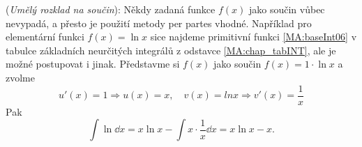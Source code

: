 \begin{mdframed}[style=mdexam]
  \begin{example}\label{mai:exam109}
    (\emph{Umělý rozklad na součin}): Někdy zadaná funkce \(f(x)\) jako součin vůbec nevypadá, a
    přesto je použití metody per partes vhodné. Například pro elementární funkci \(f(x) = \ln x\)
    sice najdeme primitivní funkci \ref{MA:baseInt06} v tabulce základních neurčitých integrálů z
    odstavce \ref{MA:chap_tabINT}, ale je možné postupovat i jinak. Představme si \(f(x)\) jako
    součin \(f(x) = 1\cdot\ln x\) a zvolme \[u'(x) = 1 ⇒ u(x) = x, \quad v(x) = lnx ⇒ v'(x) =
    \frac{1}{x}\] Pak 
    \begin{equation*}
      \int\ln\dd{x} = x\ln x - \int x\cdot\frac{1}{x}\dd{x}= x\ln x - x.
    \end{equation*}
  \end{example}
\end{mdframed}
